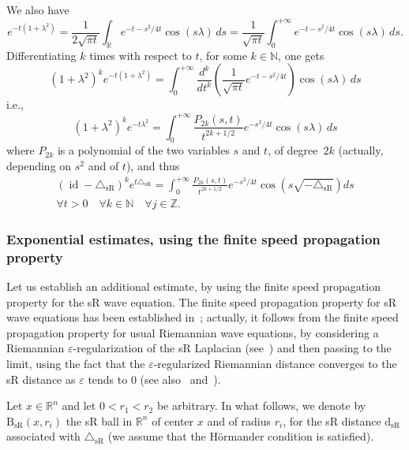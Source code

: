 \documentclass[10pt]{amsart}
\theoremstyle{definition}\newtheorem{defi}[theo]{Definition}\newtheorem{rema}[theo]{Remark}\newtheorem{exam}[theo]{Example}\newtheorem{exem}[theo]{Example}\newtheorem{nota}[theo]{Notation}
\newcommand*\R{\mathbb{R}}
\newcommand*\N{\mathbb{N}}
\newcommand*\Z{\mathbb{Z}}
\DeclareMathOperator{\id}{id}
\newcommand{\trianglesR}{\triangle_{\mathrm{sR}}}
\newcommand{\dsR}{\mathrm{d}_{\mathrm{sR}}}
\newcommand{\BsR}{\mathrm{B}_{\mathrm{sR}}}
\let\oldforall\forall
\renewcommand*{\forall}{\mathrel{\oldforall}}
\begin{document}
We also have
\[
e^{-t\left(1+\lambda^2\right)} = \frac{1}{2\sqrt{\pi t}} \int_\R e^{-t-s^2/4t} \cos(s\lambda)\, ds = \frac{1}{\sqrt{\pi t}} \int_0^{+\infty} e^{-t-s^2/4t} \cos(s\lambda)\, ds.
\]
Differentiating $k$ times with respect to $t$, for some $k\in\N$, one gets
\[
\left(1+\lambda^2\right)^ke^{-t(1+\lambda^2)} = \int_0^{+\infty} \frac{d^k}{dt^k}\left(\frac{1}{\sqrt{\pi t}} e^{-t-s^2/4t}\right) \cos(s\lambda)\, ds
\]
i.e.,
\[
\left(1+\lambda^2\right)^ke^{-t\lambda^2} = \int_0^{+\infty} \frac{P_{2k}(s,t)}{t^{2k+1/2}} e^{-s^2/4t} \cos(s\lambda)\, ds
\]
where $P_{2k}$ is a polynomial of the two variables $s$ and $t$, of degree~$2k$ (actually, depending on $s^2$ and of $t$), and thus
\begin{multline}\label{fourierjk}
\left(\id-\trianglesR\right)^ke^{t\trianglesR} = \int_0^{+\infty} \frac{P_{2k}(s,t)}{t^{2k+1/2}} e^{-s^2/4t} \cos\left(s\sqrt{-\trianglesR}\right) ds \\
\forall t>0\quad \forall k\in\N\quad\forall j\in\Z.
\end{multline}



\subsubsection{Exponential estimates, using the finite speed propagation property}
Let us establish an additional estimate, by using the finite speed propagation property for the sR wave equation. The finite speed propagation property for sR wave equations has been established in~\cite{Me-84}; actually, it follows from the finite speed propagation property for usual Riemannian wave equations, by considering a Riemannian $\varepsilon$-regularization of the sR Laplacian (see~\cite{Ge}) and then passing to the limit, using the fact that the $\varepsilon$-regularized Riemannian distance converges to the sR distance as $\varepsilon$ tends to $0$ (see also~\cite[Section~1.4.D]{Gromov} and~\cite[Appendix A4]{Varopoulos}).

Let $x\in\R^n$ and let $0<r_1<r_2$ be arbitrary. In what follows, we denote by $\BsR(x,r_i)$ the sR ball in $\R^n$ of center $x$ and of radius $r_i$, for the sR distance $\dsR$ associated with $\trianglesR$ (we assume that the H\"ormander condition is satisfied).
\end{document}

